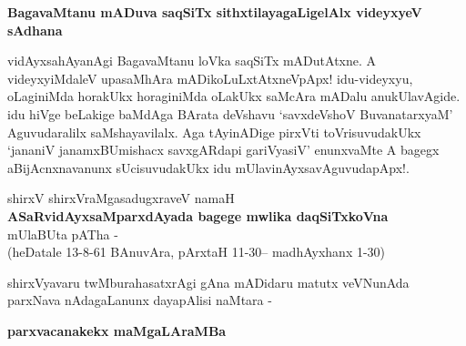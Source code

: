 \noindent
\textbf{BagavaMtanu mADuva saqSiTx sithxtilayagaLigelAlx videyxyeV sAdhana}\label{page101}

vidAyxsahAyanAgi BagavaMtanu loVka saqSiTx mADutAtxne. A videyxyiMdaleV upasaMhAra mADikoLuLxtAtxneVpApx! idu-videyxyu, oLaginiMda horakUkx horaginiMda oLakUkx saMcAra mADalu anukUlavAgide. idu hiVge beLakige baMdAga BArata deVshavu `savxdeVshoV BuvanatarxyaM' Aguvudaralilx saMshayavilalx. Aga tAyinADige pirxVti toVrisuvudakUkx `jananiV janamxBUmishacx savxgARdapi gariVyasiV'\label{101} enunxvaMte A bagegx aBijAcnxnavanunx sUcisuvudakUkx idu mUlavinAyxsavAguvudapApx!.


\begin{center}
shirxV shirxVraMgasadugxraveV namaH\\
\textbf{ASaRvidAyxsaMparxdAyada bagege mwlika daqSiTxkoVna}\\
mUlaBUta pATha -\\
(heDatale 13-8-61 BAnuvAra, pArxtaH 11-30-- madhAyxhanx 1-30)
\end{center}

shirxVyavaru twMburahasatxrAgi gAna mADidaru matutx veVNunAda parxNava nAdagaLanunx dayapAlisi naMtara -

\noindent
\textbf{parxvacanakekx maMgaLAraMBa}\label{page102}

